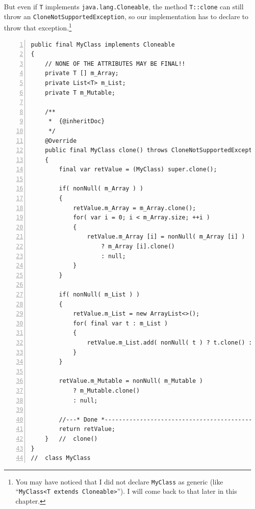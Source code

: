 \documentclass[11pt,a4paper, titlepage, parskip=half, headsepline, footsepline, cleardoublepage=current, headheight=1cm]{scrbook}
\begin{document}
But even if \lstinline|T| implements \lstinline|java.lang.Cloneable|, the method \lstinline|T::clone| can still throw an \lstinline|CloneNotSupportedException|, so our implementation has to declare to throw that exception.\footnote{You may have noticed that I did not declare \lstinline|MyClass| as generic (like “\lstinline|MyClass<T extends Cloneable>|”). I will come back to that later in this chapter.}
\begin{lstlisting}[numbers=left]
public final MyClass implements Cloneable
{
    // NONE OF THE ATTRIBUTES MAY BE FINAL!!
    private T [] m_Array;
    private List<T> m_List;
    private T m_Mutable;
    
    /**
     *  {@inheritDoc}
     */
    @Override
    public final MyClass clone() throws CloneNotSupportedException
    {
        final var retValue = (MyClass) super.clone();
        
        if( nonNull( m_Array ) )
        {
            retValue.m_Array = m_Array.clone();
            for( var i = 0; i < m_Array.size; ++i )
            {
                retValue.m_Array [i] = nonNull( m_Array [i] ) 
                    ? m_Array [i].clone() 
                    : null;
            }
        }
        
        if( nonNull( m_List ) )
        {
            retValue.m_List = new ArrayList<>();
            for( final var t : m_List )
            {
                retValue.m_List.add( nonNull( t ) ? t.clone() : null );
            }
        }
        
        retValue.m_Mutable = nonNull( m_Mutable ) 
            ? m_Mutable.clone()
            : null;
        
        //---* Done *------------------------------------------------
        return retValue;
    }   //  clone() 
}
//  class MyClass
\end{lstlisting}
\end{document}

